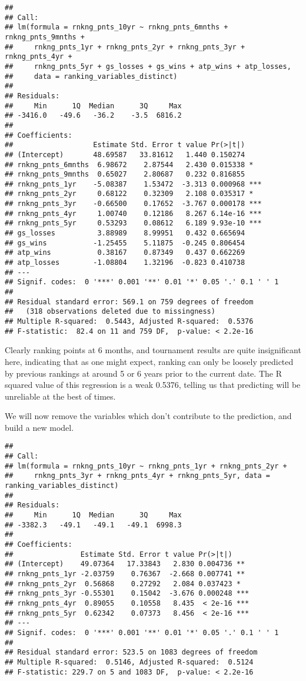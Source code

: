 \documentclass[]{article}
\begin{document}
\begin{verbatim}
## 
## Call:
## lm(formula = rnkng_pnts_10yr ~ rnkng_pnts_6mnths + rnkng_pnts_9mnths + 
##     rnkng_pnts_1yr + rnkng_pnts_2yr + rnkng_pnts_3yr + rnkng_pnts_4yr + 
##     rnkng_pnts_5yr + gs_losses + gs_wins + atp_wins + atp_losses, 
##     data = ranking_variables_distinct)
## 
## Residuals:
##     Min      1Q  Median      3Q     Max 
## -3416.0   -49.6   -36.2    -3.5  6816.2 
## 
## Coefficients:
##                   Estimate Std. Error t value Pr(>|t|)    
## (Intercept)       48.69587   33.81612   1.440 0.150274    
## rnkng_pnts_6mnths  6.98672    2.87544   2.430 0.015338 *  
## rnkng_pnts_9mnths  0.65027    2.80687   0.232 0.816855    
## rnkng_pnts_1yr    -5.08387    1.53472  -3.313 0.000968 ***
## rnkng_pnts_2yr     0.68122    0.32309   2.108 0.035317 *  
## rnkng_pnts_3yr    -0.66500    0.17652  -3.767 0.000178 ***
## rnkng_pnts_4yr     1.00740    0.12186   8.267 6.14e-16 ***
## rnkng_pnts_5yr     0.53293    0.08612   6.189 9.93e-10 ***
## gs_losses          3.88989    8.99951   0.432 0.665694    
## gs_wins           -1.25455    5.11875  -0.245 0.806454    
## atp_wins           0.38167    0.87349   0.437 0.662269    
## atp_losses        -1.08804    1.32196  -0.823 0.410738    
## ---
## Signif. codes:  0 '***' 0.001 '**' 0.01 '*' 0.05 '.' 0.1 ' ' 1
## 
## Residual standard error: 569.1 on 759 degrees of freedom
##   (318 observations deleted due to missingness)
## Multiple R-squared:  0.5443, Adjusted R-squared:  0.5376 
## F-statistic:  82.4 on 11 and 759 DF,  p-value: < 2.2e-16
\end{verbatim}

Clearly ranking points at 6 months, and tournament results are quite
insignificant here, indicating that as one might expect, ranking can
only be loosely predicted by previous rankings at around 5 or 6 years
prior to the current date. The R squared value of this regression is a
weak 0.5376, telling us that predicting will be unreliable at the best
of times.

We will now remove the variables which don't contribute to the
prediction, and build a new model.

\begin{verbatim}
## 
## Call:
## lm(formula = rnkng_pnts_10yr ~ rnkng_pnts_1yr + rnkng_pnts_2yr + 
##     rnkng_pnts_3yr + rnkng_pnts_4yr + rnkng_pnts_5yr, data = ranking_variables_distinct)
## 
## Residuals:
##     Min      1Q  Median      3Q     Max 
## -3382.3   -49.1   -49.1   -49.1  6998.3 
## 
## Coefficients:
##                Estimate Std. Error t value Pr(>|t|)    
## (Intercept)    49.07364   17.33843   2.830 0.004736 ** 
## rnkng_pnts_1yr -2.03759    0.76367  -2.668 0.007741 ** 
## rnkng_pnts_2yr  0.56868    0.27292   2.084 0.037423 *  
## rnkng_pnts_3yr -0.55301    0.15042  -3.676 0.000248 ***
## rnkng_pnts_4yr  0.89055    0.10558   8.435  < 2e-16 ***
## rnkng_pnts_5yr  0.62342    0.07373   8.456  < 2e-16 ***
## ---
## Signif. codes:  0 '***' 0.001 '**' 0.01 '*' 0.05 '.' 0.1 ' ' 1
## 
## Residual standard error: 523.5 on 1083 degrees of freedom
## Multiple R-squared:  0.5146, Adjusted R-squared:  0.5124 
## F-statistic: 229.7 on 5 and 1083 DF,  p-value: < 2.2e-16
\end{verbatim}
\end{document}
